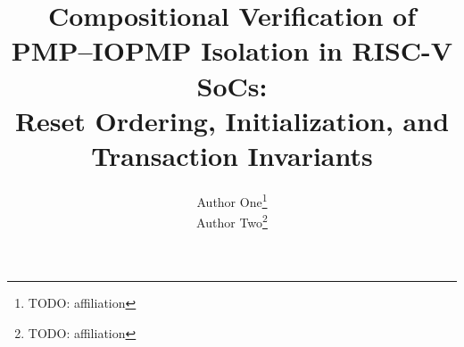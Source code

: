 \documentclass[conference]{IEEEtran}
\title{Compositional Verification of PMP--IOPMP Isolation in RISC-V SoCs:\\
Reset Ordering, Initialization, and Transaction Invariants}
\author{
  Author One\thanks{TODO: affiliation} \\
  Author Two\thanks{TODO: affiliation}
}
\begin{document}
\maketitle


















\appendices




\end{document}

